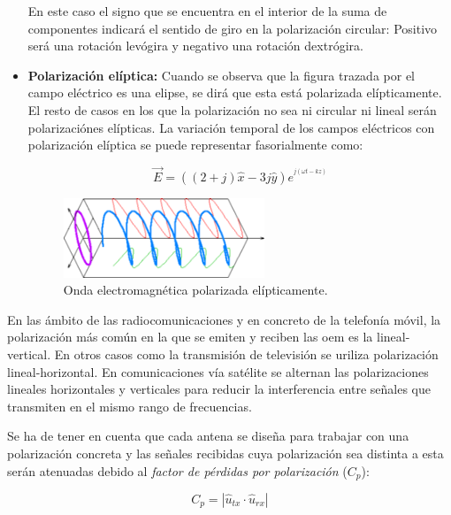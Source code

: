 \begin{itemize}
En este caso el signo que se encuentra en el interior de la suma de componentes indicará el sentido de giro en la polarización circular: Positivo será una rotación levógira y negativo una rotación dextrógira.

\item\textbf{Polarización elíptica: }Cuando se observa que la figura trazada por el campo eléctrico es una elipse, se dirá que esta está polarizada elípticamente. El resto de casos en los que la polarización no sea ni circular ni lineal serán polarizaciónes elípticas. La variación temporal de los campos eléctricos con polarización elíptica se puede representar fasorialmente como:

\begin{equation}
	\vec{E} = ((2+j)\hat{x}-3j\hat{y})e^{^{j(\omega t-kz)}}
	\label{eq:polelip}
\end{equation}
\begin{figure}[H]
    \centering
        \includegraphics[width=6cm]{archivos/polarizacion/eliptica}
        \caption{Onda electromagnética polarizada elípticamente.}
        \label{fig:poleli}
\end{figure}

\end{itemize}

\par En las ámbito de las radiocomunicaciones y en concreto de la telefonía móvil, la polarización más común en la que se emiten y reciben las \gls{oem} es la lineal-vertical. En otros casos como la transmisión de televisión se uriliza polarización lineal-horizontal. En comunicaciones vía satélite se alternan las polarizaciones lineales horizontales y verticales para reducir la interferencia entre señales que transmiten en el mismo rango de frecuencias.
\\
\par Se ha de tener en cuenta que cada antena se diseña para trabajar con una polarización concreta y las señales recibidas cuya polarización sea distinta a esta serán atenuadas debido al \textit{factor de pérdidas por polarización} ($C_{p}$):

\begin{equation}
	C_{p}=\left | \hat{u}_{tx}\cdot \hat{u}_{rx} \right |
	\label{eq:polarizationlossfactor}
\end{equation}


